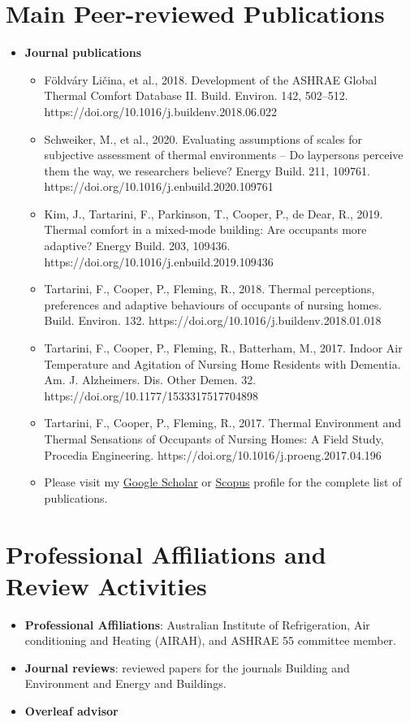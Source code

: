 \documentclass[a4paper,11pt]{article}
\newcommand{\resumeItemPaper}[1]{
    \item\small{
            {#1}
    }
}
\newcommand{\resumeSubHeadingListStart}{\begin{itemize}[leftmargin=*]}
\newcommand{\resumeSubHeadingListEnd}{\end{itemize}}
\newcommand{\resumeItemListStart}{\begin{itemize}}
\newcommand{\resumeItemListEnd}{\end{itemize}\vspace{-5pt}}
\begin{document}
\section{Main Peer-reviewed Publications}
\resumeSubHeadingListStart
\item{
\textbf{Journal publications}
\resumeItemListStart
\resumeItemPaper{Földváry Ličina, et al., 2018. Development of the ASHRAE Global Thermal Comfort Database II. Build. Environ. 142, 502–512. https://doi.org/10.1016/j.buildenv.2018.06.022}
\resumeItemPaper{Schweiker, M., et al., 2020. Evaluating assumptions of scales for subjective assessment of thermal environments – Do laypersons perceive them the way, we researchers believe? Energy Build. 211, 109761. https://doi.org/10.1016/j.enbuild.2020.109761}
\resumeItemPaper{Kim, J., Tartarini, F., Parkinson, T., Cooper, P., de Dear, R., 2019. Thermal comfort in a mixed-mode building: Are occupants more adaptive? Energy Build. 203, 109436. https://doi.org/10.1016/j.enbuild.2019.109436}
\resumeItemPaper{Tartarini, F., Cooper, P., Fleming, R., 2018. Thermal perceptions, preferences and adaptive behaviours of occupants of nursing homes. Build. Environ. 132. https://doi.org/10.1016/j.buildenv.2018.01.018}
\resumeItemPaper{Tartarini, F., Cooper, P., Fleming, R., Batterham, M., 2017. Indoor Air Temperature and Agitation of Nursing Home Residents with Dementia. Am. J. Alzheimers. Dis. Other Demen. 32. https://doi.org/10.1177/1533317517704898}
\resumeItemPaper{Tartarini, F., Cooper, P., Fleming, R., 2017. Thermal Environment and Thermal Sensations of Occupants of Nursing Homes: A Field Study, Procedia Engineering. https://doi.org/10.1016/j.proeng.2017.04.196}
\resumeItemPaper{Please visit my \href{https://scholar.google.com/citations?user=QcamSPwAAAAJ&hl=en}{Google Scholar} or \href{https://www.scopus.com/authid/detail.uri?authorId=57194517775}{Scopus} profile for the complete list of publications.}
\resumeItemListEnd
}
\resumeSubHeadingListEnd

\section{Professional Affiliations and Review Activities}
\resumeSubHeadingListStart
\item{
\textbf{Professional Affiliations}: Australian Institute of Refrigeration, Air conditioning and Heating (AIRAH), and ASHRAE 55 committee member.
}
\item{
\textbf{Journal reviews}: reviewed papers for the journals Building and Environment and Energy and Buildings.
}
\item{
\textbf{Overleaf advisor}
}
\resumeSubHeadingListEnd
\end{document}
